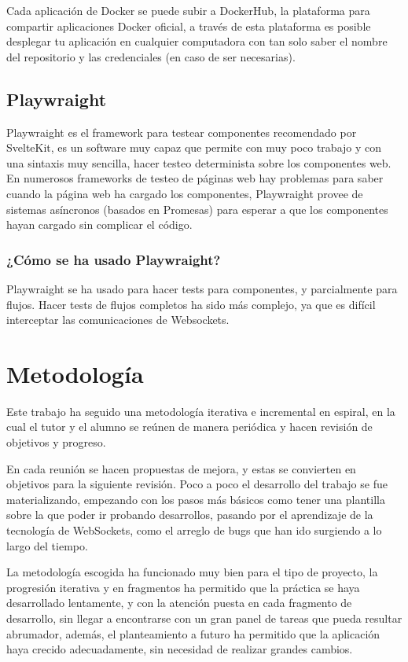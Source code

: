 Cada aplicación de Docker se puede subir a DockerHub, la plataforma para compartir aplicaciones Docker oficial, a través de esta plataforma es posible desplegar tu aplicación en cualquier computadora con tan solo saber el nombre del repositorio y las credenciales (en caso de ser necesarias).

\subsection{Playwraight}
Playwraight es el framework para testear componentes recomendado por SvelteKit, es un software muy capaz que permite con muy poco trabajo y con una sintaxis muy sencilla, hacer testeo determinista sobre los componentes web. En numerosos frameworks de testeo de páginas web hay problemas para saber cuando la página web ha cargado los componentes, Playwraight provee de sistemas asíncronos (basados en Promesas) para esperar a que los componentes hayan cargado sin complicar el código.

\subsubsection{¿Cómo se ha usado Playwraight?}
Playwraight se ha usado para hacer tests para componentes, y parcialmente para flujos. Hacer tests de flujos completos ha sido más complejo, ya que es difícil interceptar las comunicaciones de Websockets.

\section{Metodología}
Este trabajo ha seguido una metodología iterativa e incremental en espiral, en la cual el tutor y el alumno se reúnen de manera periódica y hacen revisión de objetivos y progreso.

En cada reunión se hacen propuestas de mejora, y estas se convierten en objetivos para la siguiente revisión. Poco a poco el desarrollo del trabajo se fue materializando, empezando con los pasos más básicos como tener una plantilla sobre la que poder ir probando desarrollos, pasando por el aprendizaje de la tecnología de WebSockets, como el arreglo de bugs que han ido surgiendo a lo largo del tiempo.

La metodología escogida ha funcionado muy bien para el tipo de proyecto, la progresión iterativa y en fragmentos ha permitido que la práctica se haya desarrollado lentamente, y con la atención puesta en cada fragmento de desarrollo, sin llegar a encontrarse con un gran panel de tareas que pueda resultar abrumador, además, el planteamiento a futuro ha permitido que la aplicación haya crecido adecuadamente, sin necesidad de realizar grandes cambios.
